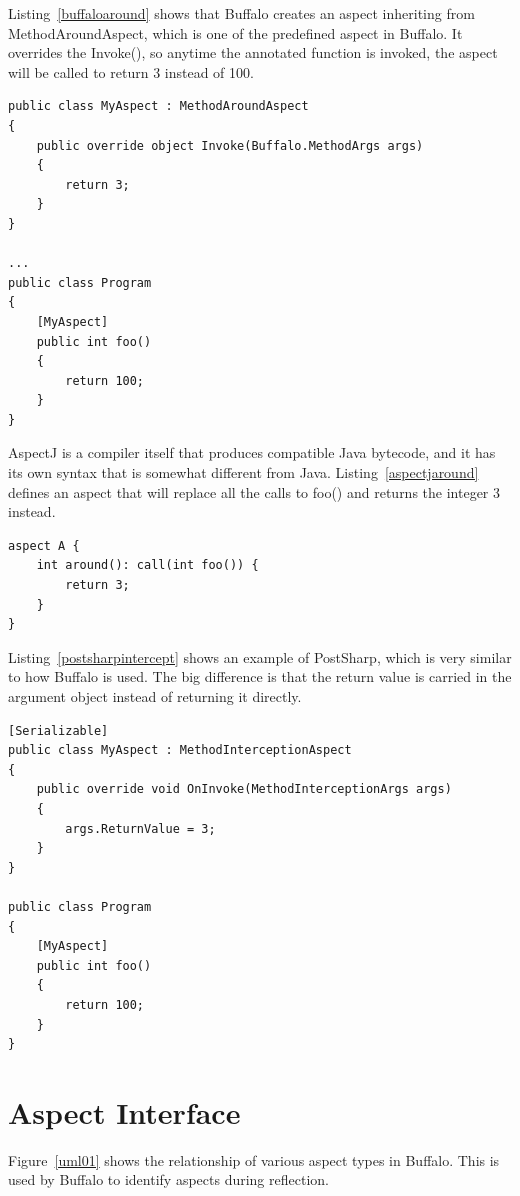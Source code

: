 Listing~\ref{buffaloaround} shows that Buffalo creates an aspect inheriting from MethodAroundAspect, which is one of the predefined aspect in Buffalo. It overrides the Invoke(), so anytime the annotated function is invoked, the aspect will be called to return 3 instead of 100.

\begin{lstlisting}[caption={Buffalo MethodAroundAspect}, label=buffaloaround]
public class MyAspect : MethodAroundAspect
{
	public override object Invoke(Buffalo.MethodArgs args)
	{
		return 3;
	}
}

...
public class Program
{
	[MyAspect]
	public int foo()
	{
		return 100;
	}
}
\end{lstlisting}

AspectJ is a compiler itself that produces compatible Java bytecode, and it has its own syntax that is somewhat different from Java. Listing~\ref{aspectjaround} defines an aspect that will replace all the calls to foo() and returns the integer 3 instead.

\begin{lstlisting}[caption={AspectJ Around}, label=aspectjaround]
aspect A {
	int around(): call(int foo()) {
		return 3;
    }
}
\end{lstlisting}


Listing~\ref{postsharpintercept} shows an example of PostSharp, which is very similar to how Buffalo is used. The big difference is that the return value is carried in the argument object instead of returning it directly.

\begin{lstlisting}[caption={PostSharp MethodInterceptionAspect}, label=postsharpintercept]
[Serializable]
public class MyAspect : MethodInterceptionAspect
{
	public override void OnInvoke(MethodInterceptionArgs args)
	{
		args.ReturnValue = 3;
	}
}

public class Program
{
	[MyAspect]
	public int foo()
	{
		return 100;
	}
}
\end{lstlisting}

\section{Aspect Interface}

Figure~\ref{uml01} shows the relationship of various aspect types in Buffalo. This is used by Buffalo to identify aspects during reflection.

